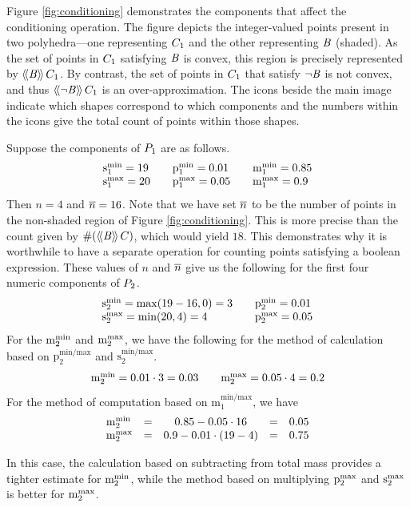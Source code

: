 Figure \ref{fig:conditioning} demonstrates the components that affect the
conditioning operation.  The figure depicts the integer-valued points
present in two polyhedra---one representing $C_{1}$ and the other
representing $\mathit{B}$ (shaded).  As the set of points in $C_{1}$
satisfying $\mathit{B}$ is convex, 
this region is precisely represented by $\langle\!\langle{\mathit{B}}\rangle\!\rangle\,{C_{1}}$.  By contrast, the set of points
in $C_{1}$ that satisfy $\neg\mathit{B}$ is not convex, and thus $\langle\!\langle{\neg\mathit{B}}\rangle\!\rangle\,{C_{1}}$ is an
over-approximation.  The icons
beside the main image indicate which shapes correspond to which components
and the numbers within the icons give the total count of points within those
shapes.

Suppose the components of $P_{1}$ are as follows.
\[
\begin{array}{l@{\qquad}l@{\qquad}l}
\smin{1} = 19 & \pmin{1} = 0.01 & \mmin{1} = 0.85 \\
\smax{1} = 20 & \pmax{1} = 0.05 & \mmax{1} = 0.9
\end{array}
\]
Then $n = 4$ and $\overline{n} = 16$.  Note that we have set $\overline{n}$ to be the
number of points in the non-shaded region of Figure \ref{fig:conditioning}.
This is more precise than the count given by $\#(\langle\!\langle{\mathit{B}}\rangle\!\rangle\,{C})$, which
would yield $18$.  This demonstrates why it is worthwhile to have a
separate operation for counting points satisfying a boolean expression.
These values of $n$ and $\overline{n}$ give us the following for
the first four numeric components of $P_{2}$.
\[
\begin{array}{l@{\qquad}l}
\smin{2} = \max(19 - 16, 0) = 3 & \pmin{2} = 0.01 \\
\smax{2} = \min(20,4) = 4 & \pmax{2} = 0.05
\end{array}
\]
For the $\mathrm{m}^\mathrm{min}_{2}$ and $\mathrm{m}^\mathrm{max}_{2}$, we have the following for the
method of calculation based on $\mathrm{p^{min/max}_2}$ and
$\mathrm{s^{min/max}_2}$.
\[
\begin{array}{l@{\qquad}l}
\mmin{2} = 0.01 \cdot 3 = 0.03  & \mmax{2} = 0.05 \cdot 4 = 0.2
\end{array}
\]
For the method of computation based on $\mathrm{m^{min/max}_1}$, we have
\[
\begin{array}{llcrr}
\mathrm{m}^\mathrm{min}_{2} &= &0.85 - 0.05 \cdot 16& =& 0.05\\
 \mathrm{m}^\mathrm{max}_{2} &= &0.9 - 0.01 \cdot (19-4)& =& 0.75
\end{array}
\]

In this case, the calculation based on subtracting from total mass
provides a tighter estimate for $\mathrm{m}^\mathrm{min}_{2}$, while the method based on
multiplying $\mathrm{p}^\mathrm{max}_{2}$ and $\mathrm{s}^\mathrm{max}_{2}$ is better for
$\mathrm{m}^\mathrm{max}_{2}$.

